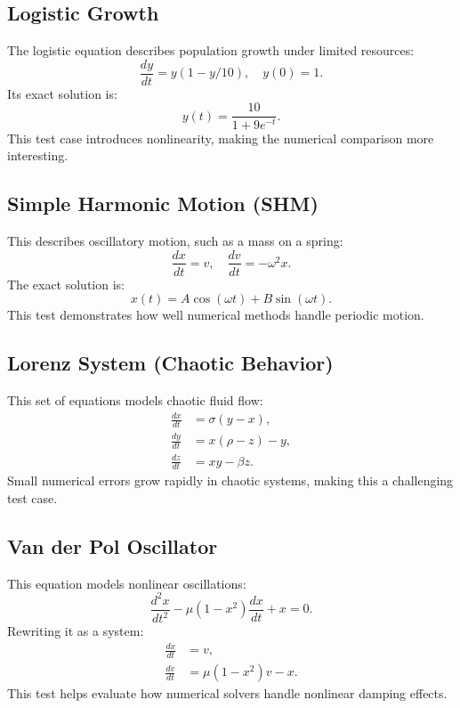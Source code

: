 \documentclass{article}
\begin{document}
\subsection{Logistic Growth}
The logistic equation describes population growth under limited resources:
\begin{equation}
    \frac{dy}{dt} = y (1 - y/10), \quad y(0) = 1.
\end{equation}
Its exact solution is:
\begin{equation}
    y(t) = \frac{10}{1 + 9e^{-t}}.
\end{equation}
This test case introduces nonlinearity, making the numerical comparison more interesting.

\subsection{Simple Harmonic Motion (SHM)}
This describes oscillatory motion, such as a mass on a spring:
\begin{equation}
    \frac{dx}{dt} = v, \quad \frac{dv}{dt} = -\omega^2 x.
\end{equation}
The exact solution is:
\begin{equation}
    x(t) = A \cos(\omega t) + B \sin(\omega t).
\end{equation}
This test demonstrates how well numerical methods handle periodic motion.

\subsection{Lorenz System (Chaotic Behavior)}
This set of equations models chaotic fluid flow:
\begin{align}
    \frac{dx}{dt} &= \sigma (y - x), \\
    \frac{dy}{dt} &= x(\rho - z) - y, \\
    \frac{dz}{dt} &= xy - \beta z.
\end{align}
Small numerical errors grow rapidly in chaotic systems, making this a challenging test case.

\subsection{Van der Pol Oscillator}
This equation models nonlinear oscillations:
\begin{equation}
    \frac{d^2x}{dt^2} - \mu(1 - x^2) \frac{dx}{dt} + x = 0.
\end{equation}
Rewriting it as a system:
\begin{align}
    \frac{dx}{dt} &= v, \\
    \frac{dv}{dt} &= \mu(1 - x^2)v - x.
\end{align}
This test helps evaluate how numerical solvers handle nonlinear damping effects.
\end{document}

